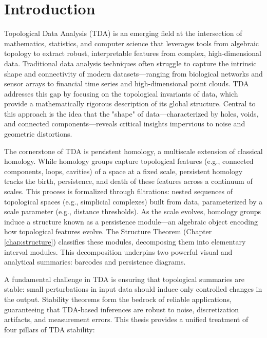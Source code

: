 \chapter*{Introduction}

Topological Data Analysis (TDA) is an emerging field at the intersection of mathematics, statistics, and computer science that leverages tools from algebraic topology to extract robust, interpretable features from complex, high-dimensional data. Traditional data analysis techniques often struggle to capture the intrinsic shape and connectivity of modern datasets—ranging from biological networks and sensor arrays to financial time series and high-dimensional point clouds. TDA addresses this gap by focusing on the topological invariants of data, which provide a mathematically rigorous description of its global structure. Central to this approach is the idea that the "shape" of data—characterized by holes, voids, and connected components—reveals critical insights impervious to noise and geometric distortions.

The cornerstone of TDA is persistent homology, a multiscale extension of classical homology. While homology groups capture topological features (e.g., connected components, loops, cavities) of a space at a fixed scale, persistent homology tracks the birth, persistence, and death of these features across a continuum of scales. This process is formalized through filtrations: nested sequences of topological spaces (e.g., simplicial complexes) built from data, parameterized by a scale parameter (e.g., distance thresholds). As the scale evolves, homology groups induce a structure known as a persistence module—an algebraic object encoding how topological features evolve. The Structure Theorem (Chapter \ref{chap:structure}) classifies these modules, decomposing them into elementary interval modules. This decomposition underpins two powerful visual and analytical summaries: barcodes and persistence diagrams.

A fundamental challenge in TDA is ensuring that topological summaries are stable: small perturbations in input data should induce only controlled changes in the output. Stability theorems form the bedrock of reliable applications, guaranteeing that TDA-based inferences are robust to noise, discretization artifacts, and measurement errors. This thesis provides a unified treatment of four pillars of TDA stability:

